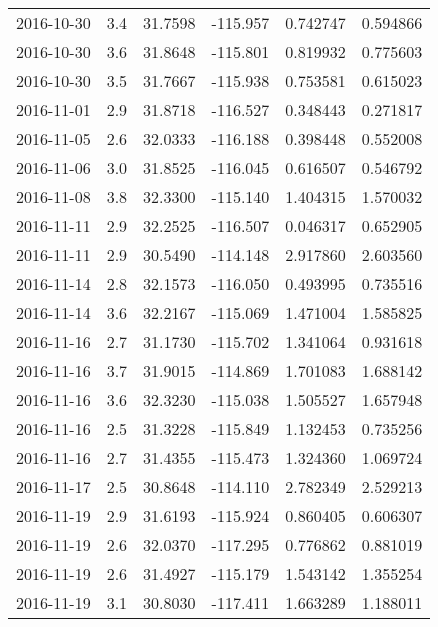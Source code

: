 \begin{tabular}{lrrrrr}
2016-10-30 &       3.4 &  31.7598 &  -115.957 &         0.742747 &         0.594866 \\
2016-10-30 &       3.6 &  31.8648 &  -115.801 &         0.819932 &         0.775603 \\
2016-10-30 &       3.5 &  31.7667 &  -115.938 &         0.753581 &         0.615023 \\
2016-11-01 &       2.9 &  31.8718 &  -116.527 &         0.348443 &         0.271817 \\
2016-11-05 &       2.6 &  32.0333 &  -116.188 &         0.398448 &         0.552008 \\
2016-11-06 &       3.0 &  31.8525 &  -116.045 &         0.616507 &         0.546792 \\
2016-11-08 &       3.8 &  32.3300 &  -115.140 &         1.404315 &         1.570032 \\
2016-11-11 &       2.9 &  32.2525 &  -116.507 &         0.046317 &         0.652905 \\
2016-11-11 &       2.9 &  30.5490 &  -114.148 &         2.917860 &         2.603560 \\
2016-11-14 &       2.8 &  32.1573 &  -116.050 &         0.493995 &         0.735516 \\
2016-11-14 &       3.6 &  32.2167 &  -115.069 &         1.471004 &         1.585825 \\
2016-11-16 &       2.7 &  31.1730 &  -115.702 &         1.341064 &         0.931618 \\
2016-11-16 &       3.7 &  31.9015 &  -114.869 &         1.701083 &         1.688142 \\
2016-11-16 &       3.6 &  32.3230 &  -115.038 &         1.505527 &         1.657948 \\
2016-11-16 &       2.5 &  31.3228 &  -115.849 &         1.132453 &         0.735256 \\
2016-11-16 &       2.7 &  31.4355 &  -115.473 &         1.324360 &         1.069724 \\
2016-11-17 &       2.5 &  30.8648 &  -114.110 &         2.782349 &         2.529213 \\
2016-11-19 &       2.9 &  31.6193 &  -115.924 &         0.860405 &         0.606307 \\
2016-11-19 &       2.6 &  32.0370 &  -117.295 &         0.776862 &         0.881019 \\
2016-11-19 &       2.6 &  31.4927 &  -115.179 &         1.543142 &         1.355254 \\
2016-11-19 &       3.1 &  30.8030 &  -117.411 &         1.663289 &         1.188011 \\

\end{tabular}
